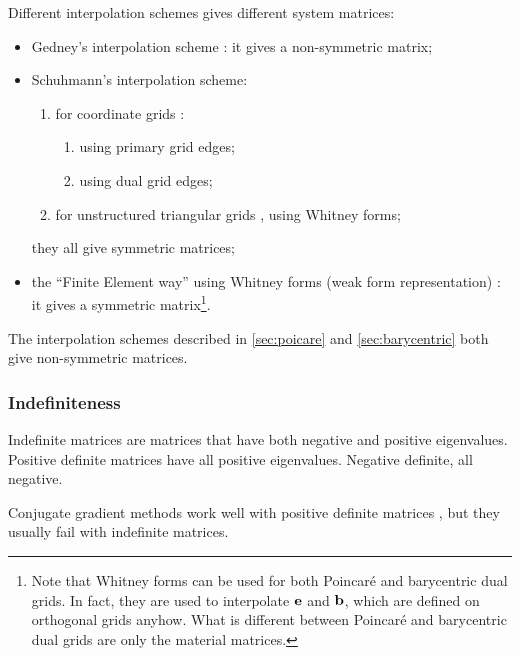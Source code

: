 \begin{description}
  Different interpolation schemes gives different system matrices:
  \begin{itemize}
  \item Gedney's interpolation scheme \cite[page
    511]{taflove_computational}: it gives a non-symmetric matrix;
  \item Schuhmann's interpolation scheme:
    \begin{enumerate}
    \item for coordinate grids \cite{schuhmann_stability}:
      \begin{enumerate}
      \item using primary grid edges;
      \item using dual grid edges;
      \end{enumerate}
    \item for unstructured triangular grids \cite{schuhmann_whitney},
      using Whitney forms;
    \end{enumerate}
    they all give symmetric matrices;
  \item the ``Finite Element way'' using Whitney forms (weak form
    representation) \cite{bossavit_yee,schuhmann_whitney}: it gives
    a symmetric matrix\footnote{Note that Whitney forms can be used
    for both Poincar\'e and barycentric dual
    grids. In fact, they are
    used to interpolate $\mathbf{e}$ and $\mathbf{b}$, which are defined
    on orthogonal grids anyhow. What is different between Poincar\'e
    and barycentric dual grids are only the material matrices.}.
  \end{itemize}

  The interpolation schemes described in \ref{sec:poicare} and
  \ref{sec:barycentric} both give non-symmetric matrices.
    
\end{description}

\subsubsection{Indefiniteness}

Indefinite matrices are matrices that have both negative and positive
eigenvalues. Positive definite matrices have all positive
eigenvalues. Negative definite, all negative.

Conjugate gradient methods work well with positive definite matrices
\cite{shewchuk_cg}, but they usually fail with indefinite matrices.


